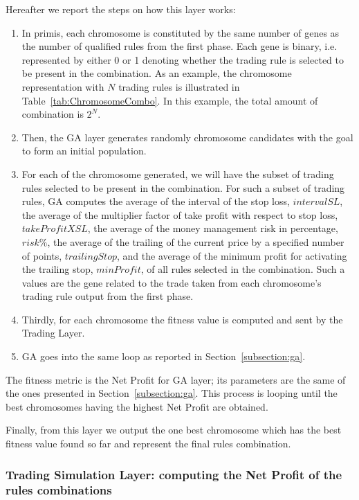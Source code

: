 \noindent Hereafter we report the steps on how this layer works:

\begin{enumerate}
\setlength\itemsep{0.3em}
\item In primis, each chromosome is constituted by the same number of genes as the number of qualified rules from the first phase. Each gene is binary, i.e. represented by either 0 or 1 denoting whether the trading rule is selected to be present in the combination. As an example, the chromosome representation with $N$ trading rules is illustrated in Table~\ref{tab:ChromosomeCombo}. In this example, the total amount of combination is $2^N$.
\item Then, the GA layer generates randomly chromosome candidates with the goal to form an initial population. 
\item For each of the chromosome generated, we will have the subset of trading rules selected to be present in the combination. For such a subset of trading rules, GA computes the average of the interval of the stop loss, $intervalSL$, the average of the multiplier factor of take profit with respect to stop loss, $takeProfitXSL$, the average of the money management risk in percentage, $risk\%$, the average of the trailing of the current price by a specified number of points, $trailingStop$, and the average of the minimum profit for activating the trailing stop, $minProfit$, of all rules selected in the combination. Such a values are the gene related to the trade taken from each chromosome's trading rule output from the first phase.
\item Thirdly, for each chromosome the fitness value is computed and sent by the Trading Layer.
\item GA goes into the same loop as reported in Section~\ref{subsection:ga}.
\end{enumerate}

The fitness metric is the Net Profit for GA layer; its parameters are the same of the ones presented in Section~\ref{subsection:ga}. This process is looping until the best chromosomes having the highest Net Profit are obtained. 

Finally, from this layer we output the one best chromosome which has the best fitness value found so far and represent the final rules combination.

\subsubsection{Trading Simulation Layer: computing the Net Profit of the rules combinations}
\label{subsection:trading2}

